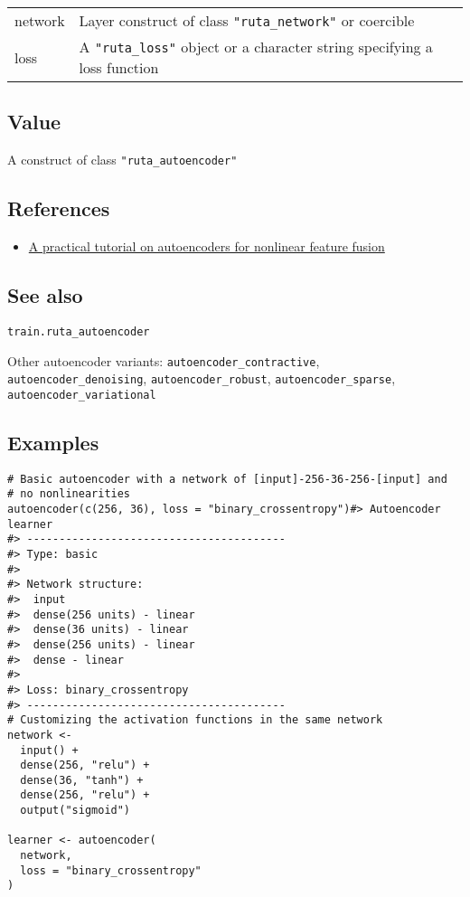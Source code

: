 \begin{longtable}[c]{@{}ll@{}}
\toprule
network & Layer construct of class \texttt{"ruta\_network"} or
coercible\tabularnewline
loss & A \texttt{"ruta\_loss"} object or a character string specifying a
loss function\tabularnewline
\bottomrule
\end{longtable}

\hypertarget{value}{\subsection{\texorpdfstring{\protect\hyperlink{value}{}Value}{Value}}\label{value}}

A construct of class \texttt{"ruta\_autoencoder"}

\hypertarget{references}{\subsection{\texorpdfstring{\protect\hyperlink{references}{}References}{References}}\label{references}}

\begin{itemize}
\tightlist
\item
  \href{https://arxiv.org/abs/1801.01586}{A practical tutorial on
  autoencoders for nonlinear feature fusion}
\end{itemize}

\hypertarget{see-also}{\subsection{\texorpdfstring{\protect\hyperlink{see-also}{}See
also}{See also}}\label{see-also}}

\texttt{train.ruta\_autoencoder}

Other autoencoder variants: \texttt{autoencoder\_contractive},
\texttt{autoencoder\_denoising}, \texttt{autoencoder\_robust},
\texttt{autoencoder\_sparse}, \texttt{autoencoder\_variational}

\hypertarget{examples}{\subsection{\texorpdfstring{\protect\hyperlink{examples}{}Examples}{Examples}}\label{examples}}

\begin{verbatim}
# Basic autoencoder with a network of [input]-256-36-256-[input] and
# no nonlinearities
autoencoder(c(256, 36), loss = "binary_crossentropy")#> Autoencoder learner
#> ----------------------------------------
#> Type: basic 
#> 
#> Network structure:
#>  input
#>  dense(256 units) - linear
#>  dense(36 units) - linear
#>  dense(256 units) - linear
#>  dense - linear
#> 
#> Loss: binary_crossentropy 
#> ----------------------------------------
# Customizing the activation functions in the same network
network <-
  input() +
  dense(256, "relu") +
  dense(36, "tanh") +
  dense(256, "relu") +
  output("sigmoid")

learner <- autoencoder(
  network,
  loss = "binary_crossentropy"
)
\end{verbatim}

